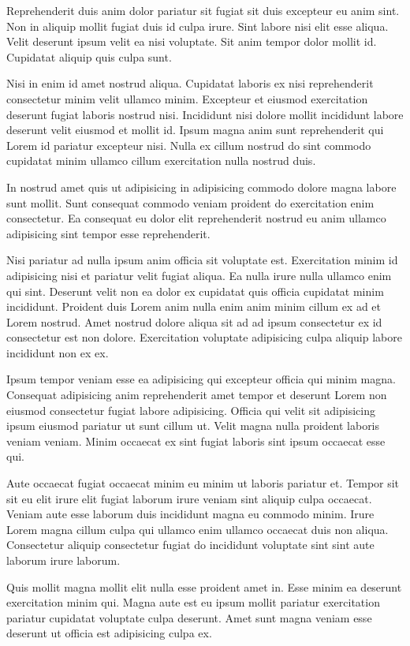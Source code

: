 Reprehenderit duis anim dolor pariatur sit fugiat sit duis excepteur eu anim sint. Non in aliquip mollit fugiat duis id culpa irure. Sint labore nisi elit esse aliqua. Velit deserunt ipsum velit ea nisi voluptate. Sit anim tempor dolor mollit id. Cupidatat aliquip quis culpa sunt.

Nisi in enim id amet nostrud aliqua. Cupidatat laboris ex nisi reprehenderit consectetur minim velit ullamco minim. Excepteur et eiusmod exercitation deserunt fugiat laboris nostrud nisi. Incididunt nisi dolore mollit incididunt labore deserunt velit eiusmod et mollit id. Ipsum magna anim sunt reprehenderit qui Lorem id pariatur excepteur nisi. Nulla ex cillum nostrud do sint commodo cupidatat minim ullamco cillum exercitation nulla nostrud duis.

In nostrud amet quis ut adipisicing in adipisicing commodo dolore magna labore sunt mollit. Sunt consequat commodo veniam proident do exercitation enim consectetur. Ea consequat eu dolor elit reprehenderit nostrud eu anim ullamco adipisicing sint tempor esse reprehenderit.

Nisi pariatur ad nulla ipsum anim officia sit voluptate est. Exercitation minim id adipisicing nisi et pariatur velit fugiat aliqua. Ea nulla irure nulla ullamco enim qui sint. Deserunt velit non ea dolor ex cupidatat quis officia cupidatat minim incididunt. Proident duis Lorem anim nulla enim anim minim cillum ex ad et Lorem nostrud. Amet nostrud dolore aliqua sit ad ad ipsum consectetur ex id consectetur est non dolore. Exercitation voluptate adipisicing culpa aliquip labore incididunt non ex ex.

Ipsum tempor veniam esse ea adipisicing qui excepteur officia qui minim magna. Consequat adipisicing anim reprehenderit amet tempor et deserunt Lorem non eiusmod consectetur fugiat labore adipisicing. Officia qui velit sit adipisicing ipsum eiusmod pariatur ut sunt cillum ut. Velit magna nulla proident laboris veniam veniam. Minim occaecat ex sint fugiat laboris sint ipsum occaecat esse qui.

Aute occaecat fugiat occaecat minim eu minim ut laboris pariatur et. Tempor sit sit eu elit irure elit fugiat laborum irure veniam sint aliquip culpa occaecat. Veniam aute esse laborum duis incididunt magna eu commodo minim. Irure Lorem magna cillum culpa qui ullamco enim ullamco occaecat duis non aliqua. Consectetur aliquip consectetur fugiat do incididunt voluptate sint sint aute laborum irure laborum.

Quis mollit magna mollit elit nulla esse proident amet in. Esse minim ea deserunt exercitation minim qui. Magna aute est eu ipsum mollit pariatur exercitation pariatur cupidatat voluptate culpa deserunt. Amet sunt magna veniam esse deserunt ut officia est adipisicing culpa ex.
